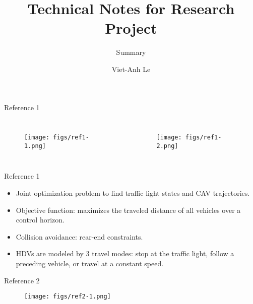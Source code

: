 \documentclass[9pt]{beamer}
\title[Research] %
{Technical Notes for Research Project}
\subtitle{Summary}
\author[Viet-Anh Le] %
{Viet-Anh Le\inst{1,2}}
\institute[UD] %
{
\inst{1}%
University of Delaware
\\
\inst{2}%
Cornell University
}
\begin{document}
\frame{\titlepage}




\begin{frame}{Reference 1}
\cite{suriyarachchi2023optimization}

\begin{columns}[onlytextwidth]
\begin{figure}
\texttt{[image: figs/ref1-1.png]}
\end{figure}
\begin{figure}
\texttt{[image: figs/ref1-2.png]}
\end{figure}
\end{columns}
\end{frame}

\begin{frame}{Reference 1}
\cite{suriyarachchi2023optimization}
\begin{itemize}
\item Joint optimization problem to find traffic light states and CAV trajectories.
\item Objective function: maximizes the traveled distance of all vehicles over a control horizon.
\item Collision avoidance: rear-end constraints.
\item HDVs are modeled by 3 travel modes: stop at the traffic light, follow a preceding vehicle, or travel at a constant speed.
\end{itemize}
\end{frame}

\begin{frame}{Reference 2}
\cite{ghosh2022traffic}
\begin{figure}
\texttt{[image: figs/ref2-1.png]}
\end{figure}
\end{frame}
\end{document}
